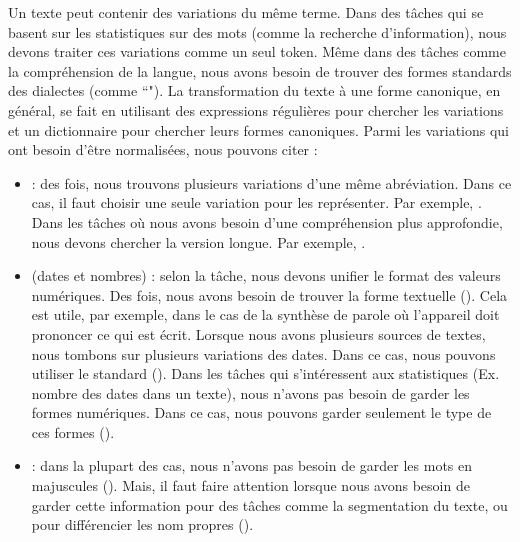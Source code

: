 \documentclass{KodeBook}
\begin{document}
Un texte peut contenir des variations du même terme. 
Dans des tâches qui se basent sur les statistiques sur des mots (comme la recherche d'information), nous devons traiter ces variations comme un seul token. 
Même dans des tâches comme la compréhension de la langue, nous avons besoin de trouver des formes standards des dialectes (comme ``").
La transformation du texte à une forme canonique, en général, se fait en utilisant des expressions régulières pour chercher les variations et un dictionnaire pour chercher leurs formes canoniques. 
Parmi les variations qui ont besoin d'être normalisées, nous pouvons citer :
\begin{itemize}
	\item {} : des fois, nous trouvons plusieurs variations d'une même abréviation.
	Dans ce cas, il faut choisir une seule variation pour les représenter. 
	Par exemple, .
	Dans les tâches où nous avons besoin d'une compréhension plus approfondie, nous devons chercher la version longue. 
	Par exemple, .
	
	\item {} (dates et nombres) : 
	selon la tâche, nous devons unifier le format des valeurs numériques. 
	Des fois, nous avons besoin de trouver la forme textuelle (). 
	Cela est utile, par exemple, dans le cas de la synthèse de parole où l'appareil doit prononcer ce qui est écrit.
	Lorsque nous avons plusieurs sources de textes, nous tombons sur plusieurs variations des dates. 
	Dans ce cas, nous pouvons utiliser le standard  ().
	Dans les tâches qui s'intéressent aux statistiques (Ex. nombre des dates dans un texte), nous n'avons pas besoin de garder les formes numériques. 
	Dans ce cas, nous pouvons garder seulement le type de ces formes ().
	
	\item {} : dans la plupart des cas, nous n'avons pas besoin de garder les mots en majuscules (). 
	Mais, il faut faire attention lorsque nous avons besoin de garder cette information pour des tâches comme la segmentation du texte, ou pour différencier les nom propres ().
	

\end{itemize}
\end{document}
